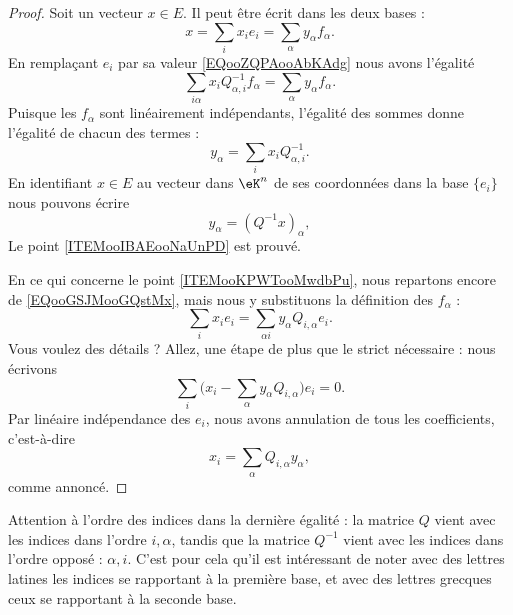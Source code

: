\begin{proof}
	Soit un vecteur \( x\in E\). Il peut être écrit dans les deux bases :
	\begin{equation}    \label{EQooGSJMooGQstMx}
		x=\sum_i x_ie_i=\sum_{\alpha}y_{\alpha}f_{\alpha}.
	\end{equation}
	En remplaçant \( e_i\) par sa valeur \eqref{EQooZQPAooAbKAdg} nous avons l'égalité
	\begin{equation}
		\sum_{i\alpha}x_iQ^{-1}_{\alpha, i}f_{\alpha}=\sum_{\alpha}y_{\alpha}f_{\alpha}.
	\end{equation}
	Puisque les \( f_{\alpha}\) sont linéairement indépendants, l'égalité des sommes donne l'égalité de chacun des termes :
	\begin{equation}
		y_{\alpha}=\sum_i x_iQ^{-1}_{\alpha, i}.
	\end{equation}
	En identifiant \( x\in E\) au vecteur dans \( \eK^n\) de ses coordonnées dans la base \( \{ e_i \}\) nous pouvons écrire
	\begin{equation}
		y_{\alpha}=(Q^{-1}x)_{\alpha},
	\end{equation}
	Le point \ref{ITEMooIBAEooNaUnPD} est prouvé.

	En ce qui concerne le point \ref{ITEMooKPWTooMwdbPu}, nous repartons encore de \eqref{EQooGSJMooGQstMx}, mais nous y substituons la définition des \( f_{\alpha}\) :
	\begin{equation}
		\sum_{i}x_ie_i=\sum_{\alpha i}y_{\alpha}Q_{i,\alpha}e_i.
	\end{equation}
	Vous voulez des détails ? Allez, une étape de plus que le strict nécessaire : nous écrivons
	\begin{equation}
		\sum_i\big( x_i-\sum_{\alpha}y_{\alpha}Q_{i,\alpha} \big)e_i=0.
	\end{equation}
	Par linéaire indépendance des \( e_i\), nous avons annulation de tous les coefficients, c'est-à-dire
	\begin{equation}
		x_i=\sum_{\alpha}Q_{i,\alpha}y_{\alpha},
	\end{equation}
	comme annoncé.
\end{proof}

\begin{normaltext}
	Attention à l'ordre des indices dans la dernière égalité : la matrice \( Q\) vient avec les indices dans l'ordre \( i,\alpha\), tandis que la matrice \( Q^{-1}\) vient avec les indices dans l'ordre opposé : \( \alpha, i\). C'est pour cela qu'il est intéressant de noter avec des lettres latines les indices se rapportant à la première base, et avec des lettres grecques ceux se rapportant à la seconde base.
\end{normaltext}

